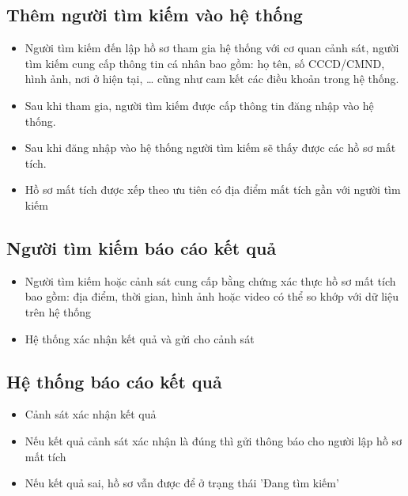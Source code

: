 \documentclass[../DoAn.tex]{subfiles}
\begin{document}
\subsection{Thêm người tìm kiếm vào hệ thống}
\begin{itemize}
	\item Người tìm kiếm đến lập hồ sơ tham gia hệ thống với cơ quan cảnh sát, người tìm kiếm cung cấp thông tin cá nhân bao gồm: họ tên, số CCCD/CMND, hình ảnh, nơi ở hiện tại, … cũng như cam kết các điều khoản trong hệ thống.
	\item Sau khi tham gia, người tìm kiếm được cấp thông tin đăng nhập vào hệ thống.
	\item Sau khi đăng nhập vào hệ thống người tìm kiếm sẽ thấy được các hồ sơ mất tích.
	\item Hồ sơ mất tích được xếp theo ưu tiên có địa điểm mất tích gần với người tìm kiếm
\end{itemize}
\subsection{Người tìm kiếm báo cáo kết quả}
\begin{itemize}
	\item Người tìm kiếm hoặc cảnh sát cung cấp bằng chứng xác thực hồ sơ mất tích bao gồm: địa điểm, thời gian, hình ảnh hoặc video có thể so khớp với dữ liệu trên hệ thống
	\item Hệ thống xác nhận kết quả và gửi cho cảnh sát
\end{itemize}
\subsection{Hệ thống báo cáo kết quả}
\begin{itemize}
	\item Cảnh sát xác nhận kết quả
	\item Nếu kết quả cảnh sát xác nhận là đúng thì gửi thông báo cho người lập hồ sơ mất tích
	\item Nếu kết quả sai, hồ sơ vẫn được để ở trạng thái 'Đang tìm kiếm'
\end{itemize}
\end{document}
